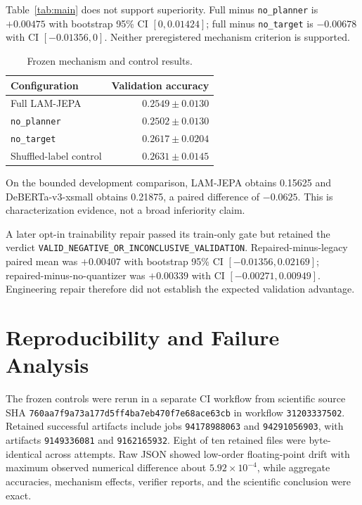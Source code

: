 \documentclass[conference]{IEEEtran}
\begin{document}
Table~\ref{tab:main} does not support superiority. Full minus \texttt{no\_planner} is $+0.00475$ with bootstrap 95\% CI $[0,0.01424]$; full minus \texttt{no\_target} is $-0.00678$ with CI $[-0.01356,0]$. Neither preregistered mechanism criterion is supported.

\begin{table}[t]
\caption{Frozen mechanism and control results.}
\label{tab:ablations}
\centering
\small
\begin{tabular}{@{}lr@{}}
\toprule
Configuration & Validation accuracy \\
\midrule
Full LAM-JEPA & $0.2549\pm0.0130$ \\
\texttt{no\_planner} & $0.2502\pm0.0130$ \\
\texttt{no\_target} & $0.2617\pm0.0204$ \\
Shuffled-label control & $0.2631\pm0.0145$ \\
\bottomrule
\end{tabular}
\end{table}

On the bounded development comparison, LAM-JEPA obtains 0.15625 and DeBERTa-v3-xsmall obtains 0.21875, a paired difference of $-0.0625$. This is characterization evidence, not a broad inferiority claim.

A later opt-in trainability repair passed its train-only gate but retained the verdict \texttt{VALID\_NEGATIVE\_OR\_INCONCLUSIVE\_VALIDATION}. Repaired-minus-legacy paired mean was $+0.00407$ with bootstrap 95\% CI $[-0.01356,0.02169]$; repaired-minus-no-quantizer was $+0.00339$ with CI $[-0.00271,0.00949]$. Engineering repair therefore did not establish the expected validation advantage.

\section{Reproducibility and Failure Analysis}
The frozen controls were rerun in a separate CI workflow from scientific source SHA \texttt{760aa7f9a73a177d5ff4ba7eb470f7e68ace63cb} in workflow \texttt{31203337502}. Retained successful artifacts include jobs \texttt{94178988063} and \texttt{94291056903}, with artifacts \texttt{9149336081} and \texttt{9162165932}. Eight of ten retained files were byte-identical across attempts. Raw JSON showed low-order floating-point drift with maximum observed numerical difference about $5.92\times10^{-4}$, while aggregate accuracies, mechanism effects, verifier reports, and the scientific conclusion were exact.
\end{document}
